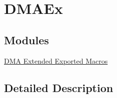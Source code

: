 \hypertarget{group___d_m_a_ex}{\section{D\-M\-A\-Ex}
\label{group___d_m_a_ex}
}
\subsection*{Modules}
\begin{DoxyCompactItemize}
\item 
\hyperlink{group___d_m_a_ex___exported___macros}{D\-M\-A Extended Exported Macros}
\end{DoxyCompactItemize}


\subsection{Detailed Description}
